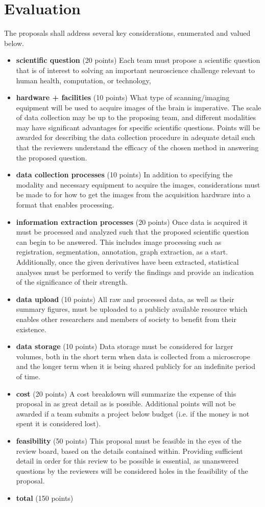 \documentclass[12pt]{article}
\begin{document}
\section{Evaluation}
\label{sec:eval}
The proposals shall address several key considerations, enumerated and valued below.
\begin{itemize}[noitemsep]
\item \textbf{scientific question} (20 points) Each team must propose a scientific question that is of interest to solving
an important neuroscience challenge relevant to human health, computation, or technology,
\item \textbf{hardware + facilities} (10 points) What type of scanning/imaging equipment will be used to acquire images
of the brain is imperative. The scale of data collection may be up to the proposing team, and different modalities
may have significant advantages for specific scientific questions. Points will be awarded for describing the data
collection procedure in adequate detail such that the reviewers understand the efficacy of the chosen method in answering
the proposed question.
\item \textbf{data collection processes} (10 points) In addition to specifying the modality and necessary equipment to acquire
the images, considerations must be made to for how to get the images from the acquisition hardware into a format that enables
processing.
\item \textbf{information extraction processes} (20 points) Once data is acquired it must be processed and analyzed such that
the proposed scientific question can begin to be answered. This includes image processing such as registration, segmentation,
annotation, graph extraction, as a start. Additionally, once the given derivatives have been extracted, statistical analyses
must be performed to verify the findings and provide an indication of the significance of their strength. 
\item \textbf{data upload} (10 points) All raw and processed data, as well as their summary figures, must be uploaded to a
publicly available resource which enables other researchers and members of society to benefit from their existence.
\item \textbf{data storage} (10 points) Data storage must be considered for larger volumes, both in the short term when data
is collected from a microscrope and the longer term when it is being shared publicly for an indefinite period of time.
\item \textbf{cost} (20 points) A cost breakdown will summarize the expense of this proposal in as great detail as is possible.
Additional points will not be awarded if a team submits a project below budget (i.e. if the money is not spent it is considered
lost).
\item \textbf{feasibility} (50 points) This proposal must be feasible in the eyes of the review board, based on the details
contained within. Providing sufficient detail in order for this review to be possible is essential, as unanswered questions by
the reviewers will be considered holes in the feasibility of the proposal.
\item \textbf{total} (150 points)
\end{itemize}
\end{document}
